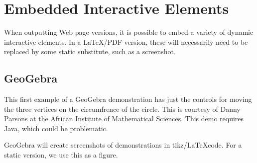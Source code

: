 \documentclass[10pt,]{article}
\theoremstyle{plain}
\theoremstyle{definition}
\begin{document}
\section{Embedded Interactive Elements}\label{section-8}
%
When outputting Web page versions, it is possible to embed a variety of dynamic interactive elements.  In a \LaTeX /PDF version, these will necessarily need to be replaced by some static substitute, such as a screenshot.
%
\typeout{************************************************}
\typeout{************************************************}
%
\subsection{GeoGebra}\label{subsection-2}
%
This first example of a  GeoGebra demonstration has just the controls for moving the three vertices on the circumfrence of the circle.  This is courtesy of Danny Parsons at the African Institute of Mathematical Sciences.  This demo requires Java, which could be problematic.
%
\par GeoGebra will create screenshots of demonstrations in tikz/\LaTeX  code.  For a static version, we use this as a figure.
%
\end{document}

